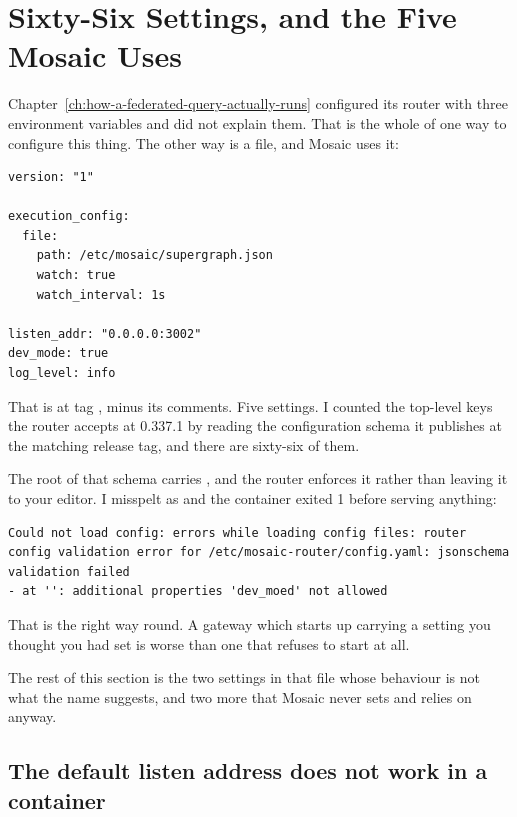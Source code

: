 \section{Sixty-Six Settings, and the Five Mosaic Uses}
\label{sec:ch10-sixty-six-settings}
%

Chapter~\ref{ch:how-a-federated-query-actually-runs} configured its router with
three environment variables and did not explain them. That is the whole of one
way to configure this thing. The other way is a file, and Mosaic uses it:

\begin{verbatim}
version: "1"

execution_config:
  file:
    path: /etc/mosaic/supergraph.json
    watch: true
    watch_interval: 1s

listen_addr: "0.0.0.0:3002"
dev_mode: true
log_level: info
\end{verbatim}

%
That is  at tag , minus its comments. Five
settings. I counted the top-level keys the router accepts at 0.337.1 by reading
the configuration schema it publishes at the matching release tag, and there
are sixty-six of them.

%
The root of that schema carries , and the
router enforces it rather than leaving it to your editor. I misspelt
 as  and the container exited 1 before serving
anything:

\begin{verbatim}
Could not load config: errors while loading config files: router config validation error for /etc/mosaic-router/config.yaml: jsonschema validation failed
- at '': additional properties 'dev_moed' not allowed
\end{verbatim}

That is the right way round. A gateway which starts up carrying a setting you
thought you had set is worse than one that refuses to start at all.

The rest of this section is the two settings in that file whose behaviour is
not what the name suggests, and two more that Mosaic never sets and relies on
anyway.

\subsection*{The default listen address does not work in a container}

